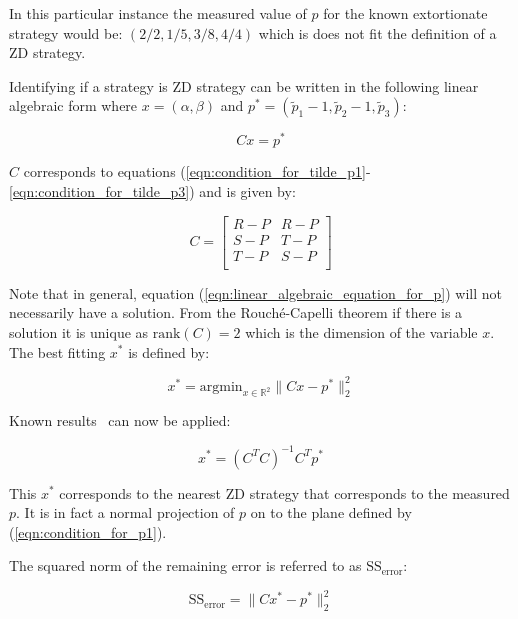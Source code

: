 \documentclass[a4paper]{article}
\begin{document}
In this particular instance the measured value of \(p\) for the known
extortionate strategy would be: \((2/2, 1/5, 3/8, 4/4)\) which is does not fit
the definition of a ZD strategy.

Identifying if a strategy is ZD strategy can be written in the following linear
algebraic form where \(x=(\alpha, \beta)\) and \(p^*=(\tilde p_1 - 1, \tilde p_2
- 1, \tilde p_3)\):

\begin{equation}\label{eqn:linear_algebraic_equation_for_p}
    Cx= p^*
\end{equation}

\(C\) corresponds to equations
(\ref{eqn:condition_for_tilde_p1}-\ref{eqn:condition_for_tilde_p3}) and is
given by:

\begin{equation}\label{eqn:definition_of_C}
    C =
    \begin{bmatrix}
        R - P & R- P \\
        S - P & T- P \\
        T - P & S- P \\
    \end{bmatrix}
\end{equation}

Note that in general, equation (\ref{eqn:linear_algebraic_equation_for_p}) will
not necessarily have a solution. From the Rouch\'{e}-Capelli theorem if there is
a solution it is unique as \(\text{rank}(C)=2\) which is the dimension of the
variable \(x\). The best fitting \(x^*\) is defined by:

\begin{equation}\label{eqn:x_star}
    x^* = \text{argmin}_{x\in\mathbb{R}^2}\|C x- p^*\|_2^2
\end{equation}

Known results~\cite{kutner2004applied, rao1973linear, wakefield2013bayesian} can
now be applied:

\begin{equation}\label{eqn:x_star_formula}
    x^* = \left(C^TC\right)^{-1}C^Tp^*
\end{equation}

This \(x^*\) corresponds to the nearest ZD strategy that corresponds to the
measured \(p\). It is in fact a normal projection of \(p\) on to the plane
defined by (\ref{eqn:condition_for_p1}).

The squared norm of the remaining error is referred to as
\(\text{SS}_{\text{error}}\):

\begin{equation}\label{eqn:r_squared}
    \text{SS}_{\text{error}} = \|C x^*- p^*\|_2^2
\end{equation}
\end{document}
